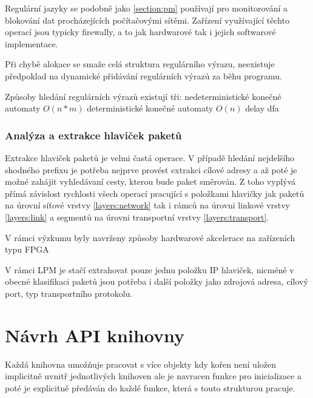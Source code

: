 Regulární jazyky se podobně jako \ref{section:pm} používají pro monitorování a blokování dat procházejících
počítačovými sítěmi. Zařízení využívající těchto operací jsou typicky firewally, a to jak hardwarové tak i jejich
softwarové implementace.

Při chybě alokace se smaže celá struktura regulárního výrazu, neexistuje předpoklad na
dynamické přidávání regulárních výrazů za běhu programu.


Způsoby hledání regulárních výrazů existují tři:
nedeterministické konečné automaty $O(n*m)$
deterministické konečné automaty $O(n)$
delay dfa \cite{delay-dfa}

\subsection{Analýza a extrakce hlaviček paketů} %

Extrakce hlaviček paketů je velmi častá operace.
V případě hledání nejdelšího shodného prefixu je potřeba nejprve provést extrakci
cílové adresy a až poté je možné zahájit vyhledávaní cesty, kterou bude paket směrován.
Z toho vyplývá přímá závislost rychlosti všech operací pracující s položkami hlavičky jak paketů
na úrovní síťové vrstvy \ref{layers:network} tak i rámců na úrovni linkové vrstvy \ref{layers:link}
a segmentů na úrovni transportní vrstvy \ref{layers:transport}.

V rámci výzkumu byly navrženy způsoby hardwarové akcelerace na zařízeních typu FPGA \cite{ant-phe}

V rámci LPM je stačí extrahovat pouze jednu položku IP hlaviček,
nicméně v obecné klasifikaci paketů jsou potřeba i další položky jako zdrojová adresa,
cílový port, typ transportního protokolu.



\chapter{Návrh API knihovny}\label{chapter:api} %

Každá knihovna umožňuje pracovat s více objekty kdy kořen není uložen implicitně
uvnitř jednotlivých knihoven ale je navracen funkce pro inicializace a poté je explicitně
předáván do každé funkce, která s touto strukturou pracuje.

